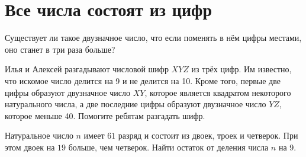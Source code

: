 \section{Все числа состоят из цифр}
\begin{itemize}

\itA Существует ли такое двузначное число, что если поменять в нём цифры местами, оно станет в три раза больше?

\itB Илья и Алексей разгадывают числовой шифр $XYZ$ из трёх цифр. Им известно, что искомое число делится на 9 и не делится на 10. Кроме того, первые две цифры образуют двузначное число $XY$, которое является квадратом некоторого натурального числа, а две последние цифры образуют двузначное число $YZ$, которое меньше 40. Помогите ребятам разгадать шифр.

\itC Натуральное число $n$ имеет $61$ разряд и состоит из двоек, троек и четверок. При этом двоек на $19$ больше, чем четверок. Найти остаток от деления числа $n$ на 9.
\end{itemize}